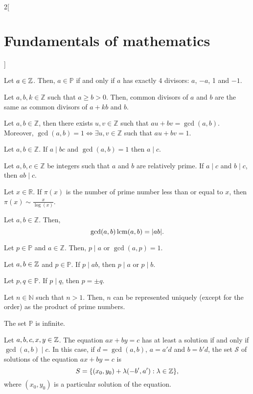 \documentclass[../../../main.tex]{subfiles}
\begin{document}
\begin{multicols}{2}[\section{Fundamentals of mathematics}]
\begin{definition}
  \end{definition}
  \begin{prop}
    Let $a\in\mathbb{Z}$. Then, $a\in\mathbb{P}$ if and only if $a$ has exactly 4 divisors: $a$, $-a$, 1 and $-1$.
  \end{prop}
  \begin{lemma}
    Let $a,b,k\in\mathbb{Z}$ such that $a\geq b>0$. Then, common divisors of $a$ and $b$ are the same as common divisors of $a+kb$ and $b$.
  \end{lemma}
  \begin{theorem}
    Let $a,b\in\mathbb{Z}$, then there exists $u,v\in\mathbb{Z}$ such that $au+bv=\gcd(a,b)$. Moreover, $\gcd(a,b)=1\iff\exists u,v\in\mathbb{Z}$ such that $au+bv=1$.
  \end{theorem}
  \begin{theorem}
    Let $a,b\in\mathbb{Z}$. If $a\mid bc$ and $\gcd(a,b)=1$ then $a\mid c$.
  \end{theorem}
  \begin{corollary}
    Let $a,b,c\in\mathbb{Z}$ be integers such that $a$ and $b$ are relatively prime. If $a\mid c$ and $b\mid c$, then $ab\mid c$.
  \end{corollary}
  \begin{theorem}
    Let $x\in\mathbb{R}$. If $\pi(x)$ is the number of prime number less than or equal to $x$, then $\pi(x)\sim\frac{x}{\log(x)}$.
  \end{theorem}
  \begin{theorem}
    Let $a,b\in\mathbb{Z}$. Then, $$\gcd(a,b)\operatorname{lcm}(a,b)=|ab|.$$
  \end{theorem}
  \begin{lemma}
    Let $p\in\mathbb{P}$ and $a\in\mathbb{Z}$. Then, $p\mid a$ or $\gcd(a,p)=1$.
  \end{lemma}
  \begin{corollary}
    Let $a,b\in\mathbb{Z}$ and $p\in\mathbb{P}$. If $p\mid ab$, then $p\mid a$ or $p\mid b$.
  \end{corollary}
  \begin{corollary}
    Let $p,q\in\mathbb{P}$. If $p\mid q$, then $p=\pm q$.
  \end{corollary}
  \begin{theorem}
    Let $n\in\mathbb{N}$ such that $n>1$. Then, $n$ can be represented uniquely (except for the order) as the product of prime numbers.
  \end{theorem}
  \begin{theorem}
    The set $\mathbb{P}$ is infinite.
  \end{theorem}
  \begin{theorem}
    Let $a,b,c,x,y\in\mathbb{Z}$. The equation $ax+by=c$ has at least a solution if and only if $\gcd(a,b)\mid c$. In this case, if $d=\gcd(a,b)$, $a=a'd$ and $b=b'd$, the set $\mathcal{S}$ of solutions of the equation $ax+by=c$ is $$S=\{(x_0,y_0)+\lambda(-b',a'):\lambda\in\mathbb{Z}\},$$ where $(x_0,y_0)$ is a particular solution of the equation.
  \end{theorem}

\end{multicols}
\end{document}
